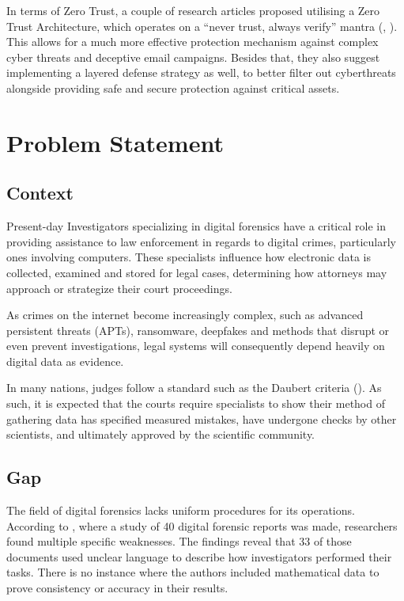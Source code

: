 \documentclass[a4paper]{report}
\begin{document}
\begin{justify}
\begin{itemize}
In terms of Zero Trust, a couple of research articles proposed utilising a Zero Trust Architecture, which operates on a “never trust, always verify” mantra (\cite{prajwalasimha2025ai}, \cite{arif2025unveiling}). This allows for a much more effective protection mechanism against complex cyber threats and deceptive email campaigns. Besides that, they also suggest implementing a layered defense strategy as well, to better filter out cyberthreats alongside providing safe and secure protection against critical assets.

\end{itemize}

\chapter{Problem Statement}

\section{Context}
Present-day Investigators specializing in digital forensics have a critical role in providing assistance to law enforcement in regards to digital crimes, particularly ones involving computers. These specialists influence how electronic data is collected, examined and stored for legal cases, determining how attorneys may approach or strategize their court proceedings.

As crimes on the internet become increasingly complex, such as advanced persistent threats (APTs), ransomware, deepfakes and methods that disrupt or even prevent investigations, legal systems will consequently depend heavily on digital data as evidence.

In many nations, judges follow a standard such as the Daubert criteria (\cite{carranza2021software}). As such, it is expected that the courts require specialists to show their method of gathering data has specified measured mistakes, have undergone checks by other scientists, and ultimately approved by the scientific community.

\section{Gap}
The field of digital forensics lacks uniform procedures for its operations. According to \cite{sharma2024digital}, where a study of 40 digital forensic reports was made, researchers found multiple specific weaknesses. The findings reveal that 33 of those documents used unclear language to describe how investigators performed their tasks. There is no instance where the authors included mathematical data to prove consistency or accuracy in their results. 


\end{justify}
\end{document}

